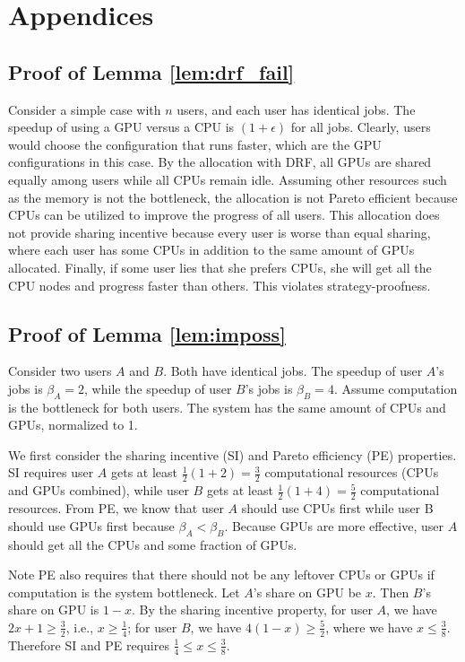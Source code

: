 \appendix
\section{Appendices}
\subsection{Proof of Lemma \ref{lem:drf_fail}}
Consider a simple case with $n$ users, and each user has identical jobs. The speedup of using a GPU versus a CPU is $(1+\epsilon)$ for all jobs. %
Clearly, users would choose the configuration that runs faster, which are the GPU configurations in this case. 
By the allocation with DRF, all GPUs are shared equally among users while all CPUs remain idle. Assuming other resources such as the memory is not the bottleneck, the allocation is not Pareto efficient because CPUs can be utilized to improve the progress of all users. 
This allocation does not provide sharing incentive because every user is worse than equal sharing, where each user has some CPUs in addition to the same amount of GPUs allocated.
Finally, if some user lies that she prefers CPUs, she will get all the CPU nodes and progress faster than others. This violates strategy-proofness.


\subsection{Proof of Lemma \ref{lem:imposs}}
Consider two users $A$ and $B$. Both have identical jobs. The speedup of user $A$'s jobs is $\beta_A=2$, while the speedup of user $B$'s jobs is $\beta_B=4$. Assume computation is the bottleneck for both users. The system has the same amount of CPUs and GPUs, normalized to 1. 

We first consider the sharing incentive (SI) and Pareto efficiency (PE) properties. SI requires user $A$ gets at least $\frac{1}{2}(1+2) = \frac{3}{2}$ computational resources (CPUs and GPUs combined), while user $B$ gets at least $\frac{1}{2}(1+4)=\frac{5}{2}$ computational resources. From PE, we know that user $A$ should use CPUs first while user B should use GPUs first because $\beta_A < \beta_B$. 
Because GPUs are more effective, user $A$ should get all the CPUs and some fraction of GPUs. 

Note PE also requires that there should not be any leftover CPUs or GPUs if computation is the system bottleneck. 
Let $A$'s share on GPU be $x$. Then $B$'s share on GPU is $1-x$. By the sharing incentive property, for user $A$, we have $2 x +1 \geq \frac{3}{2}$, i.e., $ x\geq \frac{1}{4}$; for user $B$, we have $4(1-x)\geq \frac{5}{2}$, where we have $x \leq \frac{3}{8}$. Therefore SI and PE requires $\frac{1}{4} \leq x \leq \frac{3}{8}$.
	
